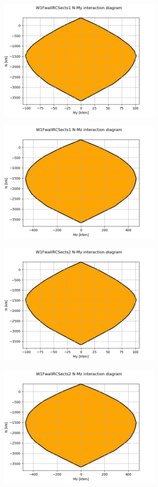 
\begin{center}
\includegraphics[width=80mm]{ramp_wall/resLC/text/sections/W1FwallRCSects1NMy}
\end{center}
\begin{center}
\includegraphics[width=80mm]{ramp_wall/resLC/text/sections/W1FwallRCSects1NMz}
\end{center}

\begin{center}
\includegraphics[width=80mm]{ramp_wall/resLC/text/sections/W1FwallRCSects2NMy}
\end{center}
\begin{center}
\includegraphics[width=80mm]{ramp_wall/resLC/text/sections/W1FwallRCSects2NMz}
\end{center}
